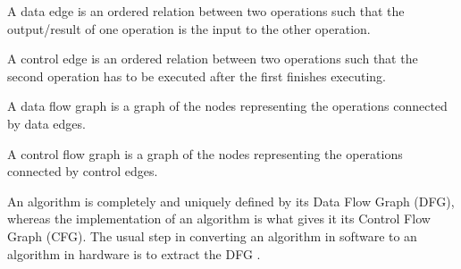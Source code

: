 \begin{defn}
  A data edge is an ordered relation between two operations such that
  the output/result of one operation is the input to the other
  operation.
\end{defn}

\begin{defn}
  A control edge is an ordered relation between two operations such
  that the second operation has to be executed after the first finishes
  executing.
\end{defn}

\begin{defn}
  A data flow graph is a graph of the nodes representing the
  operations connected by data edges.
\end{defn}

\begin{defn}
  A control flow graph is a graph of the nodes representing the
  operations connected by control edges.
\end{defn}

An algorithm is completely and uniquely defined by its Data Flow Graph
(DFG), whereas the implementation of an algorithm is what gives it its
Control Flow Graph (CFG). The usual step in converting an algorithm in
software to an algorithm in hardware is to extract the DFG
\cite{Schaumont}.

